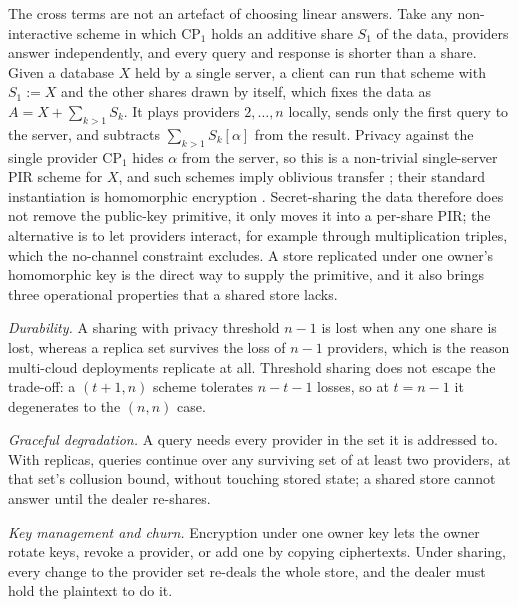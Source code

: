 \documentclass[a4paper,fleqn]{cas-sc}
\begin{document}
The cross terms are not an artefact of choosing linear answers. Take any
non-interactive scheme in which $\text{CP}_1$ holds an additive share $S_1$ of
the data, providers answer independently, and every query and response is
shorter than a share. Given a database $X$ held by a single server, a client
can run that scheme with $S_1:=X$ and the other shares drawn by itself, which
fixes the data as $A=X+\sum_{k>1}S_k$. It plays providers $2,\dots,n$ locally,
sends only the first query to the server, and subtracts $\sum_{k>1}S_k[\alpha]$
from the result. Privacy against the single provider $\text{CP}_1$ hides
$\alpha$ from the server, so this is a non-trivial single-server PIR scheme for
$X$, and such schemes imply oblivious transfer \citep{dicrescenzo2000single};
their standard instantiation is homomorphic encryption
\citep{kushilevitz1997replication}. Secret-sharing the data therefore does not
remove the public-key primitive, it only moves it into a per-share PIR; the
alternative is to let providers interact, for example through multiplication
triples, which the no-channel constraint excludes. A store replicated under one
owner's homomorphic key is the direct way to supply the primitive, and it also
brings three operational properties that a shared store lacks.

\emph{Durability.} A sharing with privacy threshold $n-1$ is lost when any one
share is lost, whereas a replica set survives the loss of $n-1$ providers,
which is the reason multi-cloud deployments replicate at all. Threshold
sharing does not escape the trade-off: a $(t{+}1,n)$ scheme tolerates
$n-t-1$ losses, so at $t=n-1$ it degenerates to the $(n,n)$ case.

\emph{Graceful degradation.} A query needs every provider in the set it is
addressed to. With replicas, queries continue over any surviving set of at
least two providers, at that set's collusion bound, without touching stored
state; a shared store cannot answer until the dealer re-shares.

\emph{Key management and churn.} Encryption under one owner key lets the owner
rotate keys, revoke a provider, or add one by copying ciphertexts. Under
sharing, every change to the provider set re-deals the whole store, and the
dealer must hold the plaintext to do it.
\end{document}
